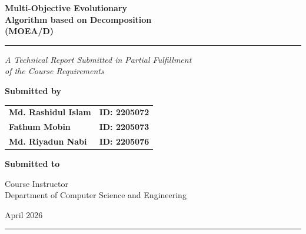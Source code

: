 \documentclass[12pt,a4paper]{article}
\begin{document}
\begin{titlepage}
    \centering
    \vspace*{1cm}
    {\Huge\bfseries\color{primaryblue}
     Multi-Objective Evolutionary\\[0.3em]
     Algorithm based on Decomposition\\[0.3em]
     \textbf{(MOEA/D)}\par}
    \vspace{0.5cm}
    \rule{\linewidth}{1.5pt}
    \vspace{0.3cm}
    {\large\itshape A Technical Report Submitted in Partial Fulfillment\\
     of the Course Requirements\par}
    \vspace{1.5cm}

    {\large\bfseries Submitted by\par}
    \vspace{0.5cm}
    \begin{tabular}{ll}
        \textbf{Md. Rashidul Islam} & \textbf{ID: 2205072} \\[4pt]
        \textbf{Fathum Mobin}       & \textbf{ID: 2205073} \\[4pt]
        \textbf{Md. Riyadun Nabi}   & \textbf{ID: 2205076} \\
    \end{tabular}

    \vspace{1.5cm}
    {\large\bfseries Submitted to\par}
    \vspace{0.3cm}
    {\large Course Instructor\\
     Department of Computer Science and Engineering\par}

    \vspace{1.5cm}

    \vspace{1cm}
    {\large April 2026\par}
    \vspace{0.5cm}
    \rule{\linewidth}{1pt}
\end{titlepage}
\end{document}
